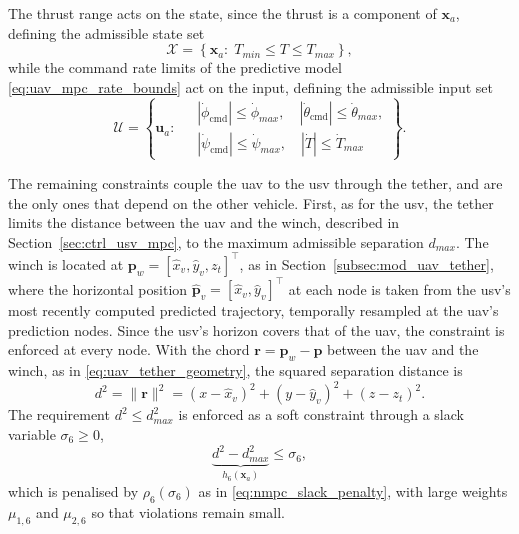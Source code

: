 The thrust range acts on the state, since the thrust is a component of $\mathbf{x}_a$, defining the admissible state set
\begin{equation}
    \mathcal{X} = \left\{ \mathbf{x}_a : \; T_{min} \le T \le T_{max} \right\},
    \label{eq:uav_mpc_set_X}
\end{equation}
while the command rate limits of the predictive model \eqref{eq:uav_mpc_rate_bounds} act on the input, defining the admissible input set
\begin{equation}
    \mathcal{U} = \left\{ \mathbf{u}_a : \;
    \begin{aligned}
        & |\dot\phi_{\mathrm{cmd}}| \le \dot\phi_{max}, \quad |\dot\theta_{\mathrm{cmd}}| \le \dot\theta_{max}, \\
        & |\dot\psi_{\mathrm{cmd}}| \le \dot\psi_{max}, \quad |\dot T| \le \dot T_{max}
    \end{aligned}
    \right\}.
    \label{eq:uav_mpc_input_set}
\end{equation}

The remaining constraints couple the \gls{uav} to the \gls{usv} through the tether, and are the only ones that depend on the other vehicle. First, as for the \gls{usv}, the tether limits the distance between the \gls{uav} and the winch, described in Section~\ref{sec:ctrl_usv_mpc}, to the maximum admissible separation $d_{max}$. The winch is located at $\mathbf{p}_w = [\hat x_v, \hat y_v, z_t]^\top$, as in Section~\ref{subsec:mod_uav_tether}, where the horizontal position $\hat{\mathbf{p}}_v = [\hat x_v, \hat y_v]^\top$ at each node is taken from the \gls{usv}'s most recently computed predicted trajectory, temporally resampled at the \gls{uav}'s prediction nodes. Since the \gls{usv}'s horizon covers that of the \gls{uav}, the constraint is enforced at every node. With the chord $\mathbf{r} = \mathbf{p}_w - \mathbf{p}$ between the \gls{uav} and the winch, as in \eqref{eq:uav_tether_geometry}, the squared separation distance is
\begin{equation}
    d^2 = \|\mathbf{r}\|^2 = (x-\hat x_v)^2 + (y-\hat y_v)^2 + (z-z_t)^2.
    \label{eq:uav_mpc_tether_distance}
\end{equation}
The requirement $d^2 \le d_{max}^2$ is enforced as a soft constraint through a slack variable $\sigma_6 \ge 0$,
\begin{equation}
    \underbrace{d^2 - d_{max}^2}_{h_6(\mathbf{x}_a)} \le \sigma_6,
    \label{eq:uav_mpc_tether_constraint}
\end{equation}
which is penalised by $\rho_6(\sigma_6)$ as in \eqref{eq:nmpc_slack_penalty}, with large weights $\mu_{1,6}$ and $\mu_{2,6}$ so that violations remain small.

